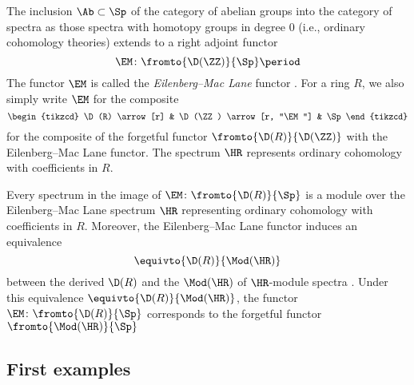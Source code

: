 \begin{recollection}\label{rec:EMspectra}
	The inclusion $ \Ab \subset \Sp $ of the category of abelian groups into the category of spectra as those spectra with homotopy groups in degree $ 0 $ (i.e., ordinary cohomology theories) extends to a right adjoint functor
	\begin{equation*}
		\EM \colon \fromto{\D(\ZZ)}{\Sp} \period
	\end{equation*}
	The functor $ \EM $ is called the \emph{Eilenberg--Mac Lane} functor .
	For a ring $ R $, we also simply write $ \EM $ for the composite
	\begin{equation*}
		\begin{tikzcd}
			\D(R) \arrow[r] & \D(\ZZ) \arrow[r, "\EM"] & \Sp
		\end{tikzcd}
	\end{equation*}
	for the composite of the forgetful functor $ \fromto{\D(R)}{\D(\ZZ)} $ with the Eilenberg--Mac Lane functor.
	The spectrum $ \HR $ represents ordinary cohomology with coefficients in $ R $.
\end{recollection}

\begin{recollection}[{($ \HR $-modules)}]
	Every spectrum in the image of $ \EM \colon \fromto{\D(R)}{\Sp} $ is a module over the Eilenberg--Mac Lane spectrum $ \HR $ representing ordinary cohomology with coefficients in $ R $.
	Moreover, the Eilenberg--Mac Lane functor induces an equivalence
	\begin{equation*}
		\equivto{\D(R)}{\Mod(\HR)}
	\end{equation*}
	between the derived \category $ \D(R) $ and the \category $ \Mod(\HR) $ of $ \HR $-module spectra .
	Under this equivalence $ \equivto{\D(R)}{\Mod(\HR)} $, the functor $ \EM \colon \fromto{\D(R)}{\Sp} $ corresponds to the forgetful functor $ \fromto{\Mod(\HR)}{\Sp} $
\end{recollection}


\subsection{First examples}\label{subsec:firstexamples}


